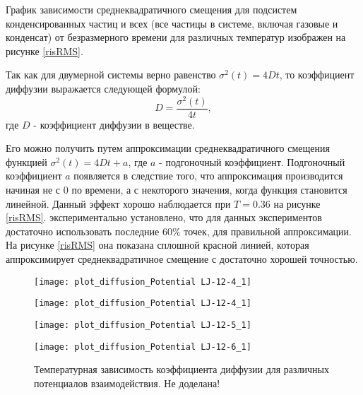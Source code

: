 График зависимости среднеквадратичного смещения для подсистем конденсированных частиц и всех (все частицы в системе, включая газовые и конденсат) от безразмерного времени для различных температур изображен на рисунке \ref{risRMS}.

Так как для двумерной системы верно равенство $\sigma^2(t) = 4Dt$, то коэффициент диффузии выражается следующей формулой:
\begin{equation}
    D = \frac{\sigma^2(t)}{4t},
    \label{eqD}
\end{equation}
где $D$ - коэффициент диффузии в веществе.

Его можно получить путем аппроксимации среднеквадратичного смещения функцией $\sigma^2(t) = 4Dt + a$, где $a$ - подгоночный коэффициент. Подгоночный коэффициент $a$ появляется в следствие того, что аппроксимация производится начиная не с 0 по времени, а с некоторого значения, когда функция становится линейной. Данный эффект хорошо наблюдается при $T = 0.36$ на рисунке \ref{risRMS}. экспериментально установлено, что для данных экспериментов достаточно использовать последние $60\%$ точек, для правильной аппроксимации. 
На рисунке \ref{risRMS} она показана сплошной красной линией, которая аппроксимирует среднеквадратичное смещение с достаточно хорошей точностью.

\begin{figure}[h]
\begin{center}
\begin{minipage}[h]{0.45\linewidth}
\texttt{[image: plot\_diffusion\_Potential LJ-12-4\_1]}
\end{minipage}
\begin{minipage}[h]{0.45\linewidth}
\texttt{[image: plot\_diffusion\_Potential LJ-12-4\_1]}
\end{minipage}
\begin{minipage}[h]{0.45\linewidth}
\texttt{[image: plot\_diffusion\_Potential LJ-12-5\_1]}
\end{minipage}
\begin{minipage}[h]{0.45\linewidth}
\texttt{[image: plot\_diffusion\_Potential LJ-12-6\_1]}
\end{minipage}
\caption{Температурная зависимость коэффициента диффузии для различных потенциалов взаимодействия. Не доделана!}
\label{risD}
\end{center}
\end{figure}

